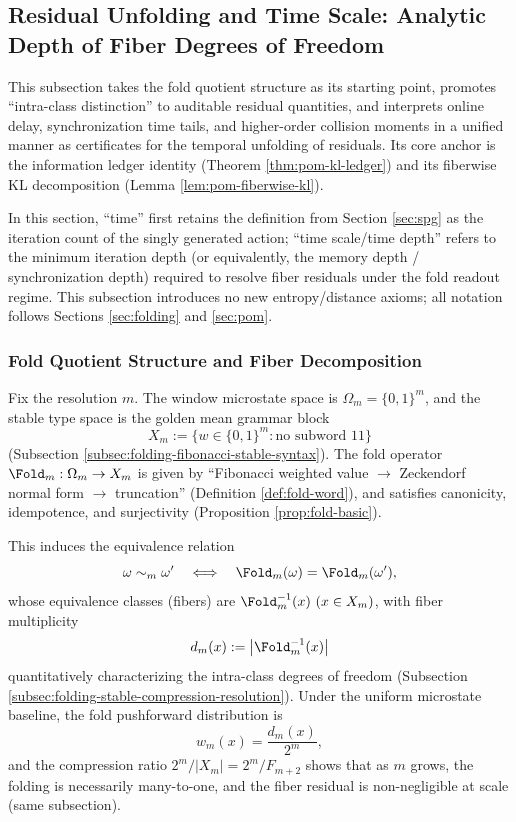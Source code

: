 \subsection{Residual Unfolding and Time Scale: Analytic Depth of Fiber Degrees of Freedom}\label{subsec:residual-unfolding-time-depth}

This subsection takes the fold quotient structure as its starting point, promotes ``intra-class distinction'' to auditable residual quantities, and interprets online delay, synchronization time tails, and higher-order collision moments in a unified manner as certificates for the temporal unfolding of residuals. Its core anchor is the information ledger identity (Theorem \ref{thm:pom-kl-ledger}) and its fiberwise KL decomposition (Lemma \ref{lem:pom-fiberwise-kl}).\par
In this section, ``time'' first retains the definition from Section \ref{sec:spg} as the iteration count of the singly generated action; ``time scale/time depth'' refers to the minimum iteration depth (or equivalently, the memory depth / synchronization depth) required to resolve fiber residuals under the fold readout regime. This subsection introduces no new entropy/distance axioms; all notation follows Sections \ref{sec:folding} and \ref{sec:pom}.

\subsubsection{Fold Quotient Structure and Fiber Decomposition}\label{subsubsec:frt-quotient-fibers}
Fix the resolution \(m\). The window microstate space is \(\Omega_m=\{0,1\}^m\), and the stable type space is the golden mean grammar block
\[
X_m:=\{w\in\{0,1\}^m:\text{no subword }11\}
\]
(Subsection \ref{subsec:folding-fibonacci-stable-syntax}). The fold operator \(\Fold_m:\Omega_m\to X_m\) is given by ``Fibonacci weighted value \(\to\) Zeckendorf normal form \(\to\) truncation'' (Definition \ref{def:fold-word}), and satisfies canonicity, idempotence, and surjectivity (Proposition \ref{prop:fold-basic}).\par
This induces the equivalence relation
\[
\omega\sim_m\omega'\quad\Longleftrightarrow\quad \Fold_m(\omega)=\Fold_m(\omega'),
\]
whose equivalence classes (fibers) are \(\Fold_m^{-1}(x)\ (x\in X_m)\), with fiber multiplicity
\[
d_m(x):=\bigl|\Fold_m^{-1}(x)\bigr|
\]
quantitatively characterizing the intra-class degrees of freedom (Subsection \ref{subsec:folding-stable-compression-resolution}). Under the uniform microstate baseline, the fold pushforward distribution is
\[
w_m(x)=\frac{d_m(x)}{2^m},
\]
and the compression ratio \(2^m/|X_m|=2^m/F_{m+2}\) shows that as \(m\) grows, the folding is necessarily many-to-one, and the fiber residual is non-negligible at scale (same subsection).

